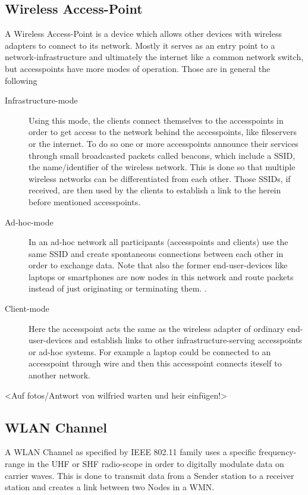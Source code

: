   \subsection{Wireless Access-Point}
    A Wireless Access-Point is a device which allows other devices with wireless adapters to connect to its network.
    Mostly it serves as an entry point to a network-infrastructure and ultimately the internet like a common network switch, 
    but accesspoints have more modes of operation. Those are in general the following
    \begin{description}
      \item[Infrastructure-mode]
	Using this mode, the clients connect themselves to the accesspoints in order to get access to the network behind the accesspoints, like fileservers or the internet.
	To do so one or more accesspoints announce their services through small broadcasted packets called beacons, which include a \ac{SSID}, 
	the name/identifier of the wireless network. This is done 
	so that multiple wireless networks can be differentiated from each other. Those SSIDs, if received, are then used by the clients to
	establish a link to the herein before mentioned accesspoints.
      \item [Ad-hoc-mode]
	In an ad-hoc network all participants (accesspoints and clients) use the same \ac{SSID} and create spontaneous connections between each other in order to 
	exchange data. Note that also the former end-user-devices like laptops or smartphones are now nodes in this network and route packets instead of just originating or
	terminating them. \cite{Akyildiz2005445}.
     \item [Client-mode]
	Here the accesspoint acts the same as the wireless adapter of ordinary end-user-devices and establish links to other infrastructure-serving accesspoints or 
	ad-hoc systems. For example a laptop could be connected to an accesspoint through wire and then this accesspoint connects iteself to another network.
    \end{description}
    
    <Auf fotos/Antwort von wilfried warten und heir einfügen!>
     
  \subsection{\ac{WLAN} Channel}
    A \ac{WLAN} Channel as specified by IEEE 802.11 family uses a specific frequency-range in the \ac{UHF} or \ac{SHF} radio-scope in order to digitally modulate data on carrier waves.
    This is done to transmit data from a Sender station to a receiver station and creates a link between two Nodes in a \ac{WMN}. 
    
